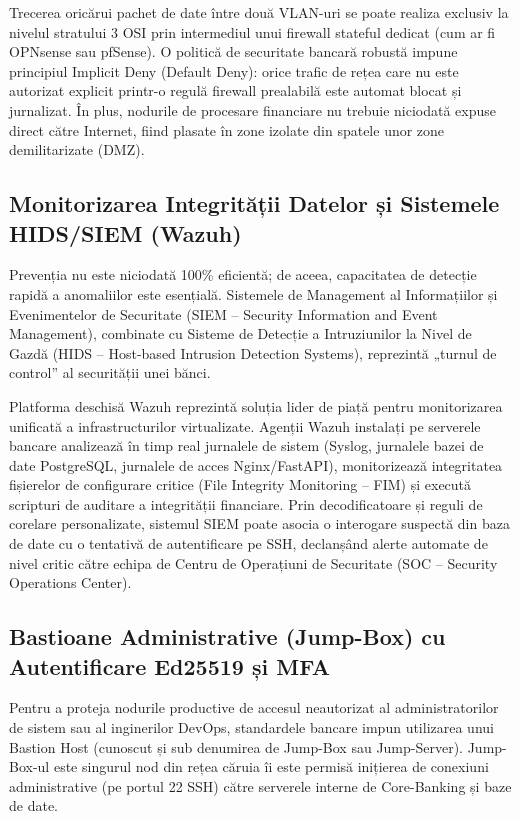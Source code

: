 Trecerea oricărui pachet de date între două VLAN-uri se poate realiza exclusiv la nivelul stratului 3 OSI prin intermediul unui firewall stateful dedicat (cum ar fi OPNsense sau pfSense). O politică de securitate bancară robustă impune principiul Implicit Deny (Default Deny): orice trafic de rețea care nu este autorizat explicit printr-o regulă firewall prealabilă este automat blocat și jurnalizat. În plus, nodurile de procesare financiare nu trebuie niciodată expuse direct către Internet, fiind plasate în zone izolate din spatele unor zone demilitarizate (DMZ).

\subsection{Monitorizarea Integrității Datelor și Sistemele HIDS/SIEM (Wazuh)}

Prevenția nu este niciodată 100\% eficientă; de aceea, capacitatea de detecție rapidă a anomaliilor este esențială. Sistemele de Management al Informațiilor și Evenimentelor de Securitate (SIEM – Security Information and Event Management), combinate cu Sisteme de Detecție a Intruziunilor la Nivel de Gazdă (HIDS – Host-based Intrusion Detection Systems), reprezintă „turnul de control” al securității unei bănci.

Platforma deschisă Wazuh reprezintă soluția lider de piață pentru monitorizarea unificată a infrastructurilor virtualizate. Agenții Wazuh instalați pe serverele bancare analizează în timp real jurnalele de sistem (Syslog, jurnalele bazei de date PostgreSQL, jurnalele de acces Nginx/FastAPI), monitorizează integritatea fișierelor de configurare critice (File Integrity Monitoring – FIM) și execută scripturi de auditare a integrității financiare. Prin decodificatoare și reguli de corelare personalizate, sistemul SIEM poate asocia o interogare suspectă din baza de date cu o tentativă de autentificare pe SSH, declanșând alerte automate de nivel critic către echipa de Centru de Operațiuni de Securitate (SOC – Security Operations Center).

\subsection{Bastioane Administrative (Jump-Box) cu Autentificare Ed25519 și MFA}

Pentru a proteja nodurile productive de accesul neautorizat al administratorilor de sistem sau al inginerilor DevOps, standardele bancare impun utilizarea unui Bastion Host (cunoscut și sub denumirea de Jump-Box sau Jump-Server). Jump-Box-ul este singurul nod din rețea căruia îi este permisă inițierea de conexiuni administrative (pe portul 22 SSH) către serverele interne de Core-Banking și baze de date.

